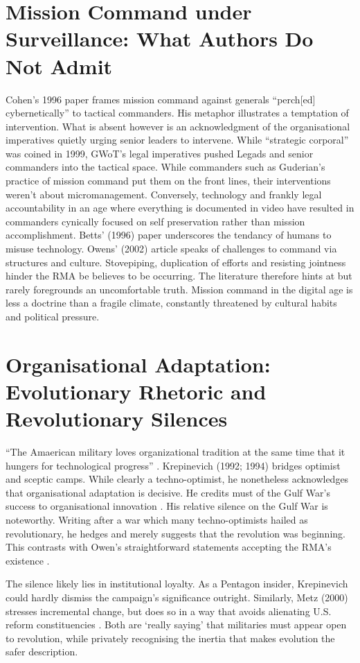 \section{Mission Command under Surveillance: What Authors Do Not Admit}
Cohen's 1996 paper frames mission command against generals ``perch[ed] cybernetically'' to tactical commanders. His metaphor illustrates a temptation of intervention. What is absent however is an acknowledgment of the organisational imperatives quietly urging senior leaders to intervene. While \textcite{KRULAK_1999} ``strategic corporal'' was coined in 1999, GWoT's legal imperatives pushed Legads and senior commanders into the tactical space. While commanders such as Guderian's practice of mission command put them on the front lines, their interventions weren't about micromanagement. Conversely, technology and frankly legal accountability in an age where everything is documented in video have resulted in commanders cynically focused on self preservation rather than mission accomplishment. Betts' (1996) paper underscores the tendancy of humans to misuse technology. Owens' (2002) article speaks of challenges to command via structures and culture. Stovepiping, duplication of efforts and resisting jointness hinder the RMA be believes to be occurring. The literature therefore hints at but rarely foregrounds an uncomfortable truth. Mission command in the digital age is less a doctrine than a fragile climate, constantly threatened by cultural habits and political pressure.

\section{Organisational Adaptation: Evolutionary Rhetoric and Revolutionary Silences}
``The Amaerican military loves organizational tradition at the same time that it hungers for technological progress'' \parencite{BETTS_1996}. Krepinevich (1992; 1994) bridges optimist and sceptic camps. While clearly a techno-optimist, he nonetheless acknowledges that organisational adaptation is decisive. He credits must of the Gulf War's success to organisational innovation  \parencite[p.~8]{KREPINEVICH_1992}. His relative silence on the Gulf War is noteworthy. Writing after a war which many techno-optimists hailed as revolutionary, he hedges and merely suggests that the revolution was beginning. This contrasts with Owen's straightforward statements accepting the RMA's existence \parencite{OWENS_2002}.

The silence likely lies in institutional loyalty. As a Pentagon insider, Krepinevich could hardly dismiss the campaign’s significance outright. Similarly, Metz (2000) stresses incremental change, but does so in a way that avoids alienating U.S. reform constituencies \parencite{METZ_2000}. Both are `really saying' that militaries must appear open to revolution, while privately recognising the inertia that makes evolution the safer description.


